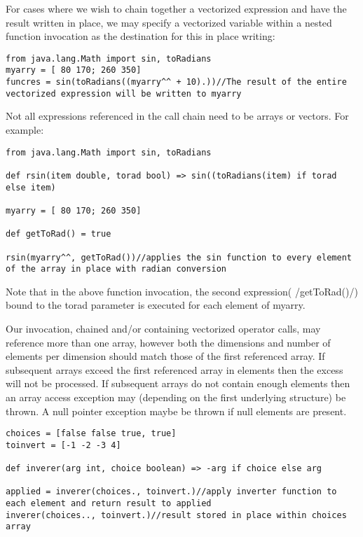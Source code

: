 \documentclass[conc-doc]{subfiles}
\begin{document}
For cases where we wish to chain together a vectorized expression and have the result written in place, we may specify a vectorized variable within a nested function invocation as the destination for this in place writing:
\begin{lstlisting}
from java.lang.Math import sin, toRadians
myarry = [ 80 170; 260 350]
funcres = sin(toRadians((myarry^^ + 10).))//The result of the entire vectorized expression will be written to myarry
\end{lstlisting}

Not all expressions referenced in the call chain need to be arrays or vectors. For example:
\begin{lstlisting}
from java.lang.Math import sin, toRadians

def rsin(item double, torad bool) => sin((toRadians(item) if torad else item)

myarry = [ 80 170; 260 350]

def getToRad() = true

rsin(myarry^^, getToRad())//applies the sin function to every element of the array in place with radian conversion
\end{lstlisting}

Note that in the above function invocation, the second expression( /getToRad()/) bound to the torad parameter is executed for each element of myarry.

Our invocation, chained and/or containing vectorized operator calls, may reference more than one array, however both the dimensions and number of elements per dimension should match those of the first referenced array. If subsequent arrays exceed the first referenced array in elements then the excess will not be processed. If subsequent arrays do not contain enough elements then an array access exception may (depending on the first underlying structure) be thrown. A null pointer exception maybe be thrown if null elements are present.
\begin{lstlisting}
choices = [false false true, true]
toinvert = [-1 -2 -3 4]

def inverer(arg int, choice boolean) => -arg if choice else arg

applied = inverer(choices., toinvert.)//apply inverter function to each element and return result to applied
inverer(choices.., toinvert.)//result stored in place within choices  array
\end{lstlisting}
\end{document}
